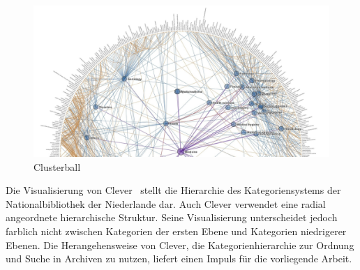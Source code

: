 \begin{figure}[H]
    \centering
    \includegraphics[width=\textwidth]{images/clusterball}
    \caption{Clusterball \cite{harrison2006clusterbal}}
    \label{fig:harr-cluster}
\end{figure}

Die Visualisierung von Clever~\cite[S.~233]{lima2017circle} stellt die Hierarchie des Kategoriensystems der Nationalbibliothek der Niederlande dar.
Auch Clever verwendet eine radial angeordnete hierarchische Struktur.
Seine Visualisierung unterscheidet jedoch farblich nicht zwischen Kategorien der ersten Ebene und Kategorien niedrigerer Ebenen.
Die Herangehensweise von Clever, die Kategorienhierarchie zur Ordnung und Suche in Archiven zu nutzen, liefert einen Impuls für die vorliegende Arbeit.










